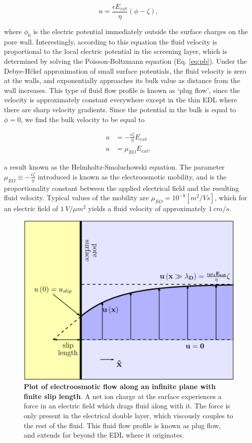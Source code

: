			\[ u=\frac{\epsilon E_{ext}}{\eta}\left(\phi-\zeta\right), \]
			
			where $\phi_{0}$ is the electric potential immediately outside the surface charges on the pore wall. Interestingly, according to this equation the fluid velocity is proportional to the local electric potential in the screening layer, which is determined by solving the Poisson-Boltzmann equation (Eq. \ref{eq:pb}). Under the Debye-H\u ckel approximation of small surface potentials, the fluid velocity is zero at the walls, and exponentially approaches its bulk value as distance from the wall increases. This type of fluid flow profile is known as `plug flow', since the velocity is approximately constant everywhere except in the thin EDL where there are sharp velocity gradients. Since the potential in the bulk is equal to $\phi=0$, we find the bulk velocity to be equal to 
			
			\begin{equation} \label{eq:hs}
				\begin{split}
					u &= -\frac{\epsilon\zeta}{\eta}E_{ext} \\
					u &= \mu_{EO}E_{ext},
				\end{split}
			\end{equation}
			
			

			
			a result known as the Helmholtz-Smoluchowski equation. The parameter $\mu_{EO}\equiv-\frac{\epsilon\zeta}{\eta}$ introduced is known as the electroosmotic mobility, and is the proportionality constant between the applied electrical field and the resulting fluid velocity. Typical values of the mobility are $\mu_{EO}=10^{-8} \left[m^{2}/V s\right]$, which for an electric field of $\SI{1}{V/\mu m^{2}}$ yields a fluid velocity of approximately $\SI{1}{cm/s}$. 
			
			\begin{figure}
				\includegraphics[width=.5\textwidth]{electroosmosis.png}
				\caption{\textbf{Plot of electroosmotic flow along an infinite plane with finite slip length}. A net ion charge at the surface experiences a force in an electric field which drags fluid along with it. The force is only present in the electrical double layer, which viscously couples to the rest of the fluid. This fluid flow profile is known as plug flow, and extends far beyond the EDL where it originates.}
				\label{fig:electroosmosis}
			\end{figure}
			
